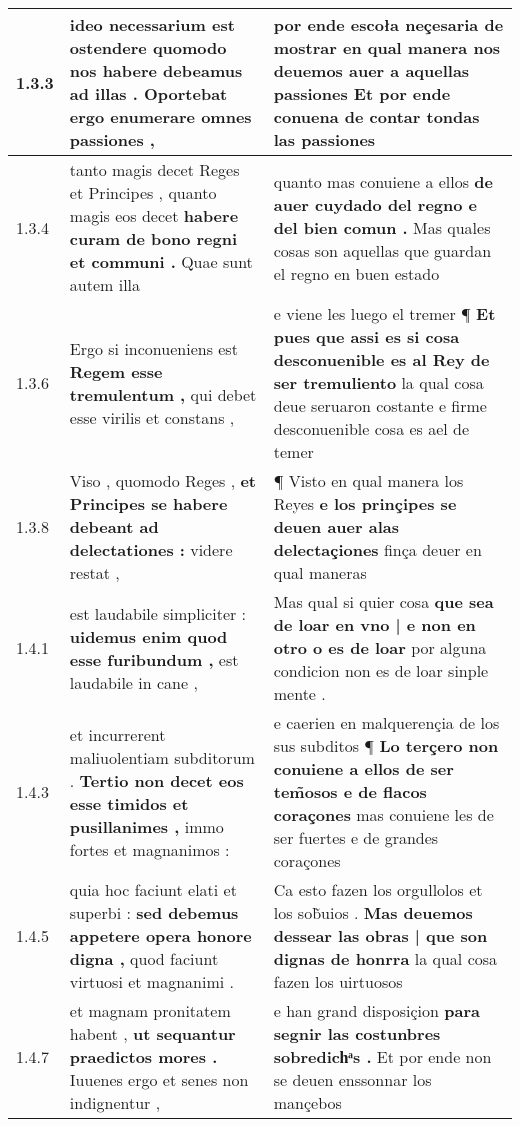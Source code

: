 \begin{tabular}{|p{1cm}|p{6.5cm}|p{6.5cm}|}
1.3.3 & ideo necessarium est ostendere \textbf{ quomodo nos habere debeamus ad illas . } Oportebat ergo enumerare omnes passiones , & por ende escoła neçesaria de mostrar \textbf{ en qual manera nos deuemos auer a aquellas passiones } Et por ende conuena de contar tondas las passiones \\\hline
1.3.4 & tanto magis decet Reges et Principes , quanto magis eos decet \textbf{ habere curam de bono regni et communi . } Quae sunt autem illa & quanto mas conuiene a ellos \textbf{ de auer cuydado del regno e del bien comun . } Mas quales cosas son aquellas que guardan el regno en buen estado \\\hline
1.3.6 & Ergo si inconueniens est \textbf{ Regem esse tremulentum , } qui debet esse virilis et constans , & e viene les luego el tremer ¶ \textbf{ Et pues que assi es si cosa desconuenible es al Rey de ser tremuliento } la qual cosa deue seruaron costante e firme desconuenible cosa es ael de temer \\\hline
1.3.8 & Viso , quomodo Reges , \textbf{ et Principes se habere debeant ad delectationes : } videre restat , & ¶ Visto en qual manera los Reyes \textbf{ e los prinçipes se deuen auer alas delectaçiones } finça deuer en qual maneras \\\hline
1.4.1 & est laudabile simpliciter : \textbf{ uidemus enim quod esse furibundum , } est laudabile in cane , & Mas qual si quier cosa \textbf{ que sea de loar en vno | e non en otro o es de loar } por alguna condicion non es de loar sinple mente . \\\hline
1.4.3 & et incurrerent maliuolentiam subditorum . \textbf{ Tertio non decet eos esse timidos et pusillanimes , } immo fortes et magnanimos : & e caerien en malquerençia de los sus subditos ¶ \textbf{ Lo terçero non conuiene a ellos de ser tem̃osos e de flacos coraçones } mas conuiene les de ser fuertes e de grandes coraçones \\\hline
1.4.5 & quia hoc faciunt elati et superbi : \textbf{ sed debemus appetere opera honore digna , } quod faciunt virtuosi et magnanimi . & Ca esto fazen los orgullolos et los sob̃uios . \textbf{ Mas deuemos dessear las obras | que son dignas de honrra } la qual cosa fazen los uirtuosos \\\hline
1.4.7 & et magnam pronitatem habent , \textbf{ ut sequantur praedictos mores . } Iuuenes ergo et senes non indignentur , & e han grand disposiçion \textbf{ para segnir las costunbres sobredichͣs . } Et por ende non se deuen enssonnar los mançebos \\\hline

\end{tabular}
